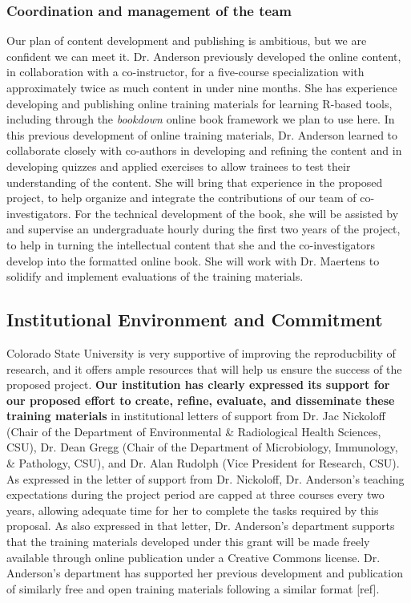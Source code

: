 \documentclass[pdftex,english,11pt,parskip=half]{scrartcl}
\begin{document}
\subsubsection*{Coordination and management of the team}



Our plan of content development and publishing is ambitious, but we are confident we can meet it. Dr. Anderson previously developed the online content, in collaboration with a co-instructor, for a five-course specialization with approximately twice as much content in under nine months. She has experience developing and publishing online training materials for learning R-based tools, including through the \textit{bookdown} online book framework we plan to use here. In this previous development of online training materials, Dr. Anderson learned to collaborate closely with co-authors in developing and refining the content and in developing quizzes and applied exercises to allow trainees to test their understanding of the content. She will bring that experience in the proposed project, to help organize and integrate the contributions of our team of co-investigators. For the technical development of the book, she will be assisted by and supervise an undergraduate hourly during the first two years of the project, to help in turning the intellectual content that she and the co-investigators develop into the formatted online book. She will work with Dr. Maertens to solidify and implement evaluations of the training materials.

\subsection{Institutional Environment and Commitment}

Colorado State University is very supportive of improving the reproducbility of research, and it offers ample resources that will help us ensure the success of the proposed project. \textbf{Our institution has clearly expressed its support for our proposed effort to create, refine, evaluate, and disseminate these training materials} in institutional letters of support from Dr. Jac Nickoloff (Chair of the Department of Environmental \& Radiological Health Sciences, CSU), Dr. Dean Gregg (Chair of the Department of Microbiology, Immunology, \& Pathology, CSU), and Dr. Alan Rudolph (Vice President for Research, CSU). As expressed in the letter of support from Dr. Nickoloff, Dr. Anderson's teaching expectations during the project period are capped at three courses every two years, allowing adequate time for her to complete the tasks required by this proposal. As also expressed in that letter, Dr. Anderson's department supports that the training materials developed under this grant will be made freely available through online publication under a Creative Commons license. Dr. Anderson's department has supported her previous development and publication of similarly free and open training materials following a similar format [ref].
\end{document}
